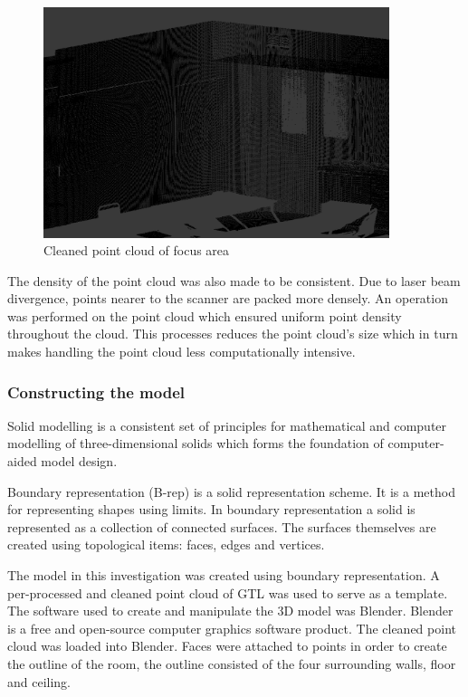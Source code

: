 \documentclass[11pt,a4paper]{report}
\begin{document}
				\begin{figure}[h!]
					\centering
					\includegraphics[width=0.9\textwidth]{cleaned_pc}
					\caption{Cleaned point cloud of focus area}
				\end{figure}
				
				The density of the point cloud was also made to be consistent. Due to laser beam divergence, points nearer to the scanner are packed more densely. An operation was performed on the point cloud which ensured uniform point density throughout the cloud. This processes reduces the point cloud's size which in turn makes handling the point cloud less computationally intensive.
				\cite{_selection_????}
				
			\subsubsection{Constructing the model}
				Solid modelling is a consistent set of principles for mathematical and computer modelling of three-dimensional solids which forms the foundation of computer-aided model design. 
				\cite{vadim_shapiro_solid_2001}
				
				Boundary representation (B-rep) is a solid representation scheme. It is a method for representing shapes using limits. In boundary representation a solid is represented as a collection of connected surfaces. The surfaces themselves are created using topological items: faces, edges and vertices.
				\cite{hongxin_zhang_introduction_2007}
				
				The model in this investigation was created using boundary representation. A per-processed and cleaned point cloud of GTL was used to serve as a template. The software used to create and manipulate the 3D model was Blender. Blender is a free and open-source computer graphics software product. The cleaned point cloud was loaded into Blender. Faces were attached to points in order to create the outline of the room, the outline consisted of the four surrounding walls, floor and ceiling.
				
\end{document}
